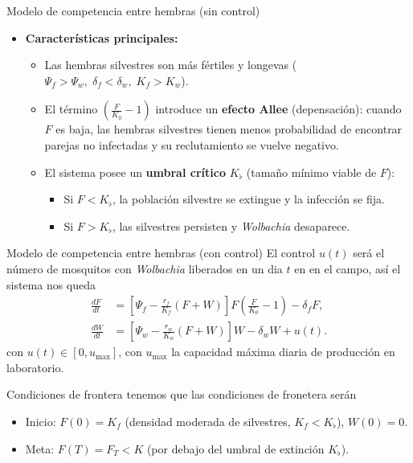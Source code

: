 \documentclass[aspectratio=169]{beamer}
\newcommand{\tb}[1]{\textbf{#1}}
\newcommand{\ti}[1]{\textit{#1}}
\begin{document}
\begin{frame}{Modelo de competencia entre hembras (sin control)}
    \begin{itemize}
        \item \textbf{Características principales:}
        \begin{itemize}
            \item Las hembras silvestres son más fértiles y longevas 
              ($\Psi_f>\Psi_w,\;\delta_f<\delta_w,\;K_f>K_w$).
            \item El término $\left(\frac{F}{K_0}-1\right)$ introduce un 
              \tb{efecto Allee} (depensación): cuando $F$ es baja, 
              las hembras silvestres tienen menos probabilidad de 
              encontrar parejas no infectadas y su reclutamiento se 
              vuelve negativo.
            \item El sistema posee un \tb{umbral crítico} $K_{\flat}$ 
              (tamaño mínimo viable de $F$):
              \begin{itemize}
                  \item Si $F < K_{\flat}$, la población silvestre 
                        se extingue y la infección se fija.
                  \item Si $F > K_{\flat}$, las silvestres persisten 
                        y \textit{Wolbachia} desaparece.
        \end{itemize}
    \end{itemize}
    \end{itemize}
\end{frame}
\begin{frame}{Modelo de competencia entre hembras (con control)}
    El control $u(t)$ será el número de mosquitos con \ti{Wolbachia} liberados en un dia $t$ en 
    en el campo, así el sistema nos queda
    \begin{align*}
                \frac{dF}{dt} &= \left[\Psi_f - \frac{r_f}{K_f}(F+W)\right] F 
                         \left(\frac{F}{K_0} - 1\right) - \delta_f F,\\
        \frac{dW}{dt} &= \left[\Psi_w - \frac{r_w}{K_w}(F+W)\right] W 
                         - \delta_w W + u(t).
    \end{align*}
    con $u(t) \in [0, u_{\max}]$, con $u_{\max}$ la capacidad máxima 
              diaria de producción en laboratorio.
\end{frame}
\begin{frame}{Condiciones de frontera}
    tenemos que las condiciones de fronetera serán
    \begin{itemize}
        \item Inicio: $F(0) = K_f$ (densidad moderada de silvestres, 
              $K_f < K_{\flat}$), \; $W(0) = 0$.
        \item Meta: $F(T) = F_T < K$ (por debajo del umbral de extinción 
              $K_{\flat}$).
    \end{itemize}
\end{frame}
\end{document}
